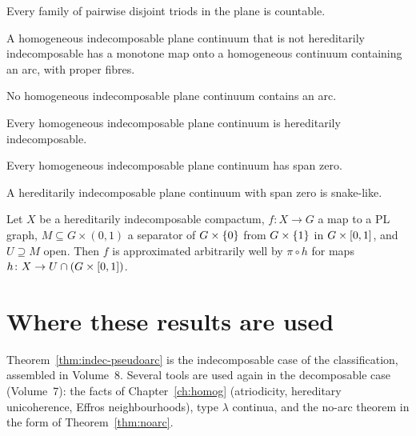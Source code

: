 \begin{theorem}
Every family of pairwise disjoint triods in the plane is countable.
\end{theorem}

\begin{theorem}
A homogeneous indecomposable plane continuum that is not hereditarily indecomposable has a monotone map onto a homogeneous continuum containing an arc, with
proper fibres.
\end{theorem}

\begin{theorem}
No homogeneous indecomposable plane continuum contains an arc.
\end{theorem}

\begin{theorem}
Every homogeneous indecomposable plane continuum is hereditarily indecomposable.
\end{theorem}

\begin{theorem}
Every homogeneous indecomposable plane continuum has span zero.
\end{theorem}

\begin{theorem}
A hereditarily indecomposable plane continuum with span zero is snake-like.
\end{theorem}

\begin{theorem}
Let $X$ be a hereditarily indecomposable compactum, $f\colon X\to G$ a map to a PL graph, $M\subseteq G\times(0,1)$ a separator of $G\times\left\{ 0 \right\}$ from $G\times\left\{ 1 \right\}$ in $G\times[0,1]$, and $U\supseteq M$
open. Then $f$ is approximated arbitrarily well by $\pi\circ h$ for maps $h\colon X\to U\cap(G\times[0,1])$.
\end{theorem}

\section{Where these results are used}

Theorem~\ref{thm:indec-pseudoarc} is the indecomposable case of the classification, assembled in Volume~8. Several tools are used again in the decomposable case
(Volume~7): the facts of Chapter~\ref{ch:homog} (atriodicity, hereditary unicoherence, Effros neighbourhoods), type $\lambda$ continua, and the no-arc theorem in
the form of Theorem~\ref{thm:noarc}.


